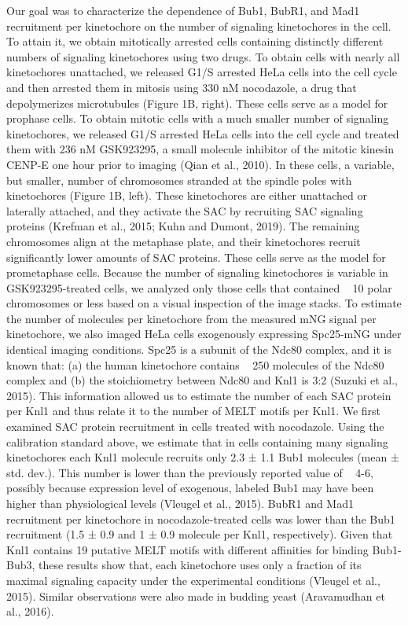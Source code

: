 Our goal was to characterize the dependence of Bub1, BubR1, and Mad1 recruitment per kinetochore on the number of signaling kinetochores in the cell. To attain it, we obtain mitotically arrested cells containing distinctly different numbers of signaling kinetochores using two drugs. To obtain cells with nearly all kinetochores unattached, we released G1/S arrested HeLa cells into the cell cycle and then arrested them in mitosis using 330 nM nocodazole, a drug that depolymerizes microtubules (Figure 1B, right). These cells serve as a model for prophase cells. To obtain mitotic cells with a much smaller number of signaling kinetochores, we released G1/S arrested HeLa cells into the cell cycle and treated them with 236 nM GSK923295, a small molecule inhibitor of the mitotic kinesin CENP-E one hour prior to imaging (Qian et al., 2010). In these cells, a variable, but smaller, number of chromosomes stranded at the spindle poles with kinetochores (Figure 1B, left). These kinetochores are either unattached or laterally attached, and they activate the SAC by recruiting SAC signaling proteins (Krefman et al., 2015; Kuhn and Dumont, 2019). The remaining chromosomes align at the metaphase plate, and their kinetochores recruit significantly lower amounts of SAC proteins. These cells serve as the model for prometaphase cells. Because the number of signaling kinetochores is variable in GSK923295-treated cells, we analyzed only those cells that contained ~ 10 polar chromosomes or less based on a visual inspection of the image stacks. To estimate the number of molecules per kinetochore from the measured mNG signal per kinetochore, we also imaged HeLa cells exogenously expressing Spc25-mNG under identical imaging conditions. Spc25 is a subunit of the Ndc80 complex, and it is known that: (a) the human kinetochore contains ~ 250 molecules of the Ndc80 complex and (b) the stoichiometry between Ndc80 and Knl1 is 3:2 (Suzuki et al., 2015). This information allowed us to estimate the number of each SAC protein per Knl1 and thus relate it to the number of MELT motifs per Knl1.
We first examined SAC protein recruitment in cells treated with nocodazole. Using the calibration standard above, we estimate that in cells containing many signaling kinetochores each Knl1 molecule recruits only 2.3 ± 1.1 Bub1 molecules (mean ± std. dev.). This number is lower than the previously reported value of ~ 4-6, possibly because expression level of exogenous, labeled Bub1 may have been higher than physiological levels (Vleugel et al., 2015). BubR1 and Mad1 recruitment per kinetochore in nocodazole-treated cells was lower than the Bub1 recruitment (1.5 ± 0.9 and 1 ± 0.9 molecule per Knl1, respectively). Given that Knl1 contains 19 putative MELT motifs with different affinities for binding Bub1-Bub3, these results show that, each kinetochore uses only a fraction of its maximal signaling capacity under the experimental conditions (Vleugel et al., 2015). Similar observations were also made in budding yeast (Aravamudhan et al., 2016).

